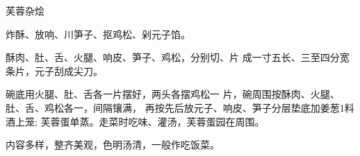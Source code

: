 \begin{recipe}{芙蓉杂烩}

\ingredients


\cooking

\step 	炸酥、放响、川笋子、抠鸡松、剁元子馅。

\step 	酥肉、肚、舌、火腿、响皮、笋子、鸡松，分别切、片 成一寸五长、三至四分宽条片，元子刮成尖刀。

\step 碗底用火腿、肚、舌各一片摆好，两头各摆鸡松一 片，碗周围按酥肉、火腿、肚、舌、鸡松各一，间隔镶满， 再按先后放元子、响皮、笋子分层垫底加姜葱1料酒上笼; 芙蓉蛋单蒸。走菜时吃味、灌汤，芙蓉蛋园在周围。

\notes

内容多样，整齐美观，色明汤清，一般作吃饭菜。

\end{recipe}

